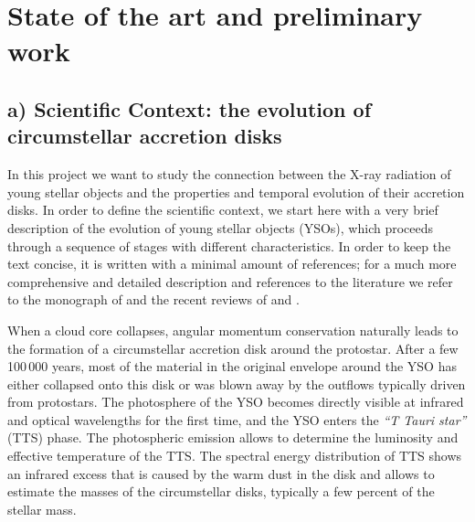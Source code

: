 \documentclass[10pt,fleqn,twoside]{article}
\begin{document}
\section{State of the art and preliminary work}
\renewcommand{\leftmark}{\sc State of the Art and preliminary work}


\subsection*{a) Scientific Context: the evolution of circumstellar accretion disks}

In this project we want to study the connection between the X-ray radiation
of young stellar objects and the properties and temporal evolution of their
accretion disks.
%
In order to define the scientific context, we start here with a very brief description
of the evolution of young stellar objects (YSOs), which
proceeds through a sequence of stages with different characteristics.
In order to keep the text concise, it is written with a minimal amount of references;
for a much more comprehensive and detailed description and references to the
literature we refer to the monograph of \citet{Hartmann08} and the recent reviews of
\citet{Alexander14} and \citet{Hartmann16}.
\medskip

When a cloud core collapses, angular momentum conservation
naturally leads to the
formation of a circumstellar accretion disk around the
protostar.
%
After a few 100\,000 years, 
most of the material in the original envelope around the YSO 
has either collapsed
onto this disk or was blown away by the outflows typically driven from
protostars. The photosphere of the YSO becomes directly visible at
infrared and optical wavelengths for the first time, and the YSO
enters the {\em ``T Tauri star''}
(TTS) phase. The photospheric emission allows to
determine the luminosity and effective temperature of the TTS.
The spectral energy distribution of TTS shows an infrared excess that is
caused by the warm dust in the disk and allows
to estimate the  masses of the circumstellar disks,
typically a few percent of the stellar mass.
 
\end{document}
